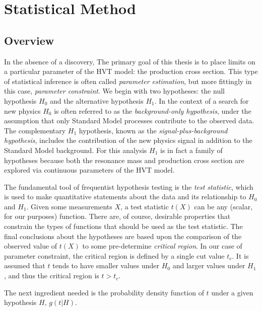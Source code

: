 \section{Statistical Method}
\label{sec:statistics}

\subsection{Overview}
In the absence of a discovery, The primary goal of this thesis is to place limits on a particular parameter of the HVT model: the production cross section.
This type of statistical inference is often called \textit{parameter estimation}, but more fittingly in this case, \textit{parameter constraint}. 
We begin with two hypotheses: the null hypothesis $H_0$ and the alternative hypothesis $H_1$.
In the context of a search for new physics $H_0$ is often referred to as the \textit{background-only hypothesis}, under the assumption that only Standard Model processes contribute to the observed data.
The complementary $H_1$ hypothesis, known as the \textit{signal-plus-background hypothesis}, includes the contribution of the new physics signal in addition to the Standard Model background.
For this analysis $H_1$ is in fact a family of hypotheses because both the resonance mass and production cross section are explored via continuous parameters of the HVT model.

The fundamental tool of frequentist hypothesis testing is the \textit{test statistic}, which is used to make quantitative statements about the data and its relationship to $H_0$ and $H_1$.
Given some measurements $X$, a test statistic $t(X)$ can be any (scalar, for our purposes) function.
There are, of course, desirable properties that constrain the types of functions that should be used as the test statistic.
The final conclusions about the hypotheses are based upon the comparison of the observed value of $t(X)$ to some pre-determine \textit{critical region}.
In our case of parameter constraint, the critical region is defined by a single cut value $t_c$.
It is assumed that $t$ tends to have smaller values under $H_0$ and larger values under $H_1$, and thus the critical region is $t > t_c$.

The next ingredient needed is the probability density function of $t$ under a given hypothesis $H$, $g(t|H)$.

